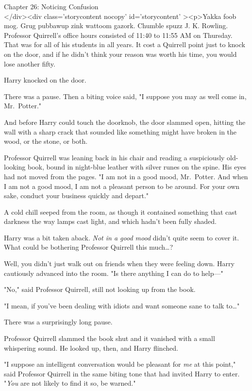 
Chapter 26: Noticing Confusion\\
</div><div  class='storycontent nocopy' id='storycontent' ><p>Yakka foob mog. 
Grug pubbawup zink wattoom gazork. Chumble spuzz J. K. Rowling.
\sbreak
Professor Quirrell's office hours consisted of 11:40 to 11:55 AM on Thursday. 
That was for all of his students in all years. It cost a Quirrell point just to 
knock on the door, and if he didn't think your reason was worth his time, you 
would lose another fifty.

Harry knocked on the door.

There was a pause. Then a biting voice said, "I suppose you may as well come 
in, Mr.~Potter."

And before Harry could touch the doorknob, the door slammed open, hitting the 
wall with a sharp crack that sounded like something might have broken in the 
wood, or the stone, or both.

Professor Quirrell was leaning back in his chair and reading a suspiciously 
old-looking book, bound in night-blue leather with silver runes on the spine. 
His eyes had not moved from the pages. "I am not in a good mood, Mr.~Potter. 
And when I am not a good mood, I am not a pleasant person to be around. For 
your own sake, conduct your business quickly and depart."

A cold chill seeped from the room, as though it contained something that cast 
darkness the way lamps cast light, and which hadn't been fully shaded.

Harry was a bit taken aback. \emph{Not in a good mood} didn't quite seem to 
cover it. What could be bothering Professor Quirrell this much{\ldots}?

Well, you didn't just walk out on friends when they were feeling down. Harry 
cautiously advanced into the room. "Is there anything I can do to help---"

"No," said Professor Quirrell, still not looking up from the book.

"I mean, if you've been dealing with idiots and want someone sane to talk 
to{\ldots}"

There was a surprisingly long pause.

Professor Quirrell slammed the book shut and it vanished with a small 
whispering sound. He looked up, then, and Harry flinched.

"I suppose an intelligent conversation would be pleasant for \emph{me} at this 
point," said Professor Quirrell in the same biting tone that had invited Harry 
to enter. "\emph{You} are not likely to find it so, be warned."

